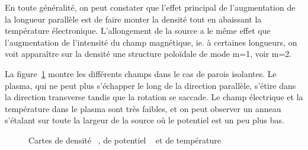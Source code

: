 \begin{refsection}
En toute généralité, on peut constater que l'effet
principal de l'augmentation de la longueur parallèle est de faire monter la
densité tout en abaissant la température électronique.
L'allongement de la source a le même effet que l'augmentation de l'intensité du
champ magnétique, ie. à certaines longueurs, on voit apparaître sur la densité
une structure poloïdale de mode m=1, voir m=2.

La figure~\ref{CybeleCartesIsolant} montre les différents champs dans le cas de
parois isolantes. Le plasma, qui ne peut plus s'échapper le long de la direction
parallèle, s'étire dans la direction transverse tandis que la rotation se
saccade.
Le champ électrique et la température dans le plasma sont très faibles, et on
peut observer un anneau s'étalant sur toute la largeur de la source où le
potentiel est un peu plus bas.

\begin{figure}[!htbp]
  \centering
    \caption{Cartes de densité ~, de
    potentiel ~ et de
    température }
    \label{CybeleCartesIsolant}
\end{figure}		


\end{refsection}

